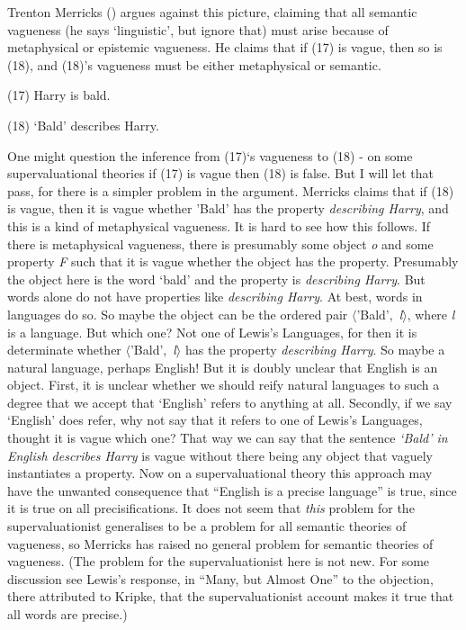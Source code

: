 \documentclass[
  10pt,
  letterpaper,
  DIV=11,
  numbers=noendperiod,
  twoside]{scrartcl}
\begin{document}
Trenton Merricks () argues against this
picture, claiming that all semantic vagueness (he says `linguistic', but
ignore that) must arise because of metaphysical or epistemic vagueness.
He claims that if (17) is vague, then so is (18), and (18)'s vagueness
must be either metaphysical or semantic.

(17) Harry is bald.

(18) `Bald' describes Harry.

One might question the inference from (17)`s vagueness to (18) - on some
supervaluational theories if (17) is vague then (18) is false. But I
will let that pass, for there is a simpler problem in the argument.
Merricks claims that if (18) is vague, then it is vague whether 'Bald'
has the property \emph{describing Harry}, and this is a kind of
metaphysical vagueness. It is hard to see how this follows. If there is
metaphysical vagueness, there is presumably some object \emph{o} and
some property \emph{F} such that it is vague whether the object has the
property. Presumably the object here is the word `bald' and the property
is \emph{describing Harry}. But words alone do not have properties like
\emph{describing Harry}. At best, words in languages do so. So maybe the
object can be the ordered pair \(\langle\)'Bald',~\emph{l}\(\rangle\),
where \emph{l} is a language. But which one? Not one of Lewis's
Languages, for then it is determinate whether
\(\langle\)'Bald',~\emph{l}\(\rangle\) has the property \emph{describing
Harry}. So maybe a natural language, perhaps English! But it is doubly
unclear that English is an object. First, it is unclear whether we
should reify natural languages to such a degree that we accept that
`English' refers to anything at all. Secondly, if we say `English' does
refer, why not say that it refers to one of Lewis's Languages, thought
it is vague which one? That way we can say that the sentence
\emph{`Bald' in English describes Harry} is vague without there being
any object that vaguely instantiates a property. Now on a
supervaluational theory this approach may have the unwanted consequence
that ``English is a precise language'' is true, since it is true on all
precisifications. It does not seem that \emph{this} problem for the
supervaluationist generalises to be a problem for all semantic theories
of vagueness, so Merricks has raised no general problem for semantic
theories of vagueness. (The problem for the supervaluationist here is
not new. For some discussion see Lewis's response, in ``Many, but Almost
One'' to the objection, there attributed to Kripke, that the
supervaluationist account makes it true that all words are precise.)
\end{document}
